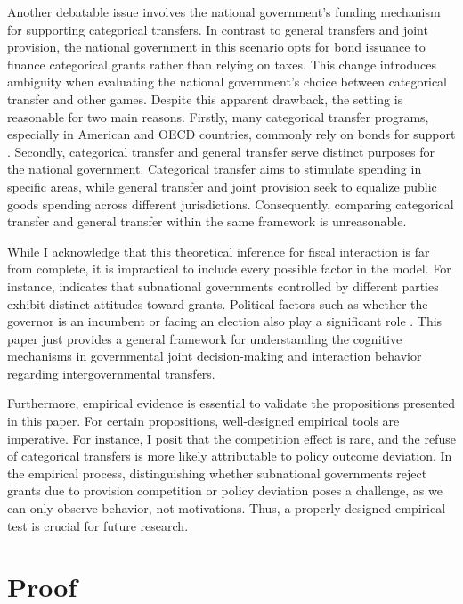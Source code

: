 \documentclass[man]{apa7}
\begin{document}
Another debatable issue involves the national government's funding mechanism for supporting categorical transfers. In contrast to general transfers and joint provision, the national government in this scenario opts for bond issuance to finance categorical grants rather than relying on taxes. This change introduces ambiguity when evaluating the national government's choice between categorical transfer and other games. Despite this apparent drawback, the setting is reasonable for two main reasons. Firstly, many categorical transfer programs, especially in American and OECD countries, commonly rely on bonds for support \cite{spahn2012conditioning,de2007local,weist2007intergovernmental}. Secondly, categorical transfer and general transfer serve distinct purposes for the national government. Categorical transfer aims to stimulate spending in specific areas, while general transfer and joint provision seek to equalize public goods spending across different jurisdictions. Consequently, comparing categorical transfer and general transfer within the same framework is unreasonable.%

While I acknowledge that this theoretical inference for fiscal interaction is far from complete, it is impractical to include every possible factor in the model. For instance, \Textcite{nicholson2012leaving} indicates that subnational governments controlled by different parties exhibit distinct attitudes toward grants. Political factors such as whether the governor is an incumbent or facing an election also play a significant role \parencite{nordhaus1975political, macrae1977political}. This paper just provides a general framework for understanding the cognitive mechanisms in governmental joint decision-making and interaction behavior regarding intergovernmental transfers.

Furthermore, empirical evidence is essential to validate the propositions presented in this paper. For certain propositions, well-designed empirical tools are imperative. For instance, I posit that the competition effect is rare, and the refuse of categorical transfers is more likely attributable to policy outcome deviation. In the empirical process, distinguishing whether subnational governments reject grants due to provision competition or policy deviation poses a challenge, as we can only observe behavior, not motivations. Thus, a properly designed empirical test is crucial for future research.

\printbibliography

\appendix

\section{Proof}
\end{document}
